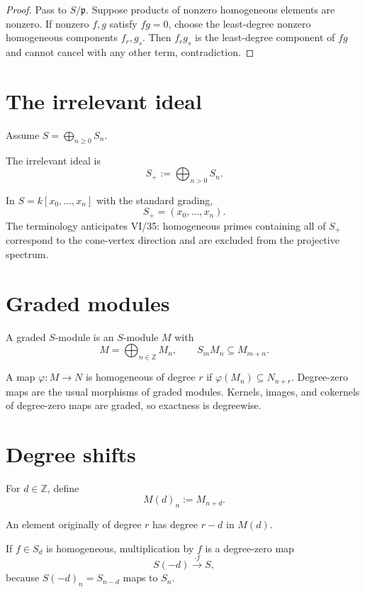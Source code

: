\begin{proof}
Pass to \(S/\mathfrak p\). Suppose products of nonzero homogeneous elements are nonzero. If nonzero \(f,g\) satisfy \(fg=0\), choose the least-degree nonzero homogeneous components \(f_r,g_s\). Then \(f_rg_s\) is the least-degree component of \(fg\) and cannot cancel with any other term, contradiction.
\end{proof}

\section{The irrelevant ideal}
Assume \(S=\bigoplus_{n\ge0}S_n\).

\begin{definition}
The irrelevant ideal is
\[
S_+:=\bigoplus_{n>0}S_n.
\]
\end{definition}

In \(S=k[x_0,\ldots,x_n]\) with the standard grading,
\[
S_+=(x_0,\ldots,x_n).
\]
The terminology anticipates VI/35: homogeneous primes containing all of \(S_+\) correspond to the cone-vertex direction and are excluded from the projective spectrum.



\section{Graded modules}
\begin{definition}
A graded \(S\)-module is an \(S\)-module \(M\) with
\[
M=\bigoplus_{n\in\mathbb Z}M_n,\qquad S_mM_n\subseteq M_{m+n}.
\]
\end{definition}

A map \(\varphi:M\to N\) is homogeneous of degree \(r\) if \(\varphi(M_n)\subseteq N_{n+r}\). Degree-zero maps are the usual morphisms of graded modules. Kernels, images, and cokernels of degree-zero maps are graded, so exactness is degreewise.

\section{Degree shifts}
\begin{definition}[Shift]
For \(d\in\mathbb Z\), define
\[
M(d)_n:=M_{n+d}.
\]
\end{definition}
An element originally of degree \(r\) has degree \(r-d\) in \(M(d)\).

If \(f\in S_d\) is homogeneous, multiplication by \(f\) is a degree-zero map
\[
S(-d)\xrightarrow{\cdot f}S,
\]
because \(S(-d)_n=S_{n-d}\) maps to \(S_n\).

